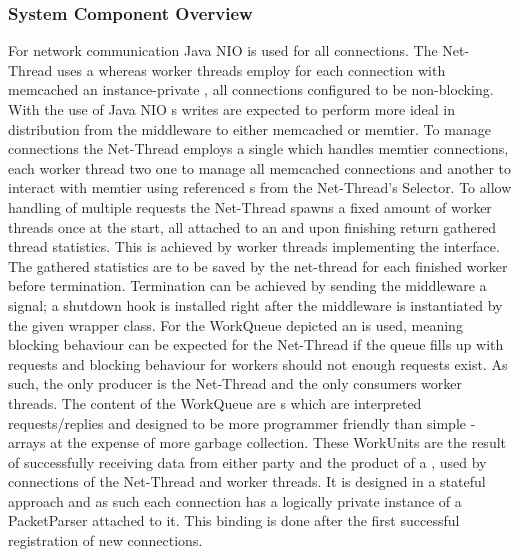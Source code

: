     \subsubsection{System Component Overview}
        For network communication Java NIO is used for all connections. The Net-Thread uses a 
        whereas worker threads employ for each connection with memcached an instance-private , all
        connections configured to be non-blocking. With the use of Java NIO s writes are expected to perform
        more ideal in distribution from the middleware to either memcached or memtier. To manage connections the
        Net-Thread employs a single  which handles memtier connections, each worker thread two\textemdash
        one to manage all memcached connections and another to interact with memtier using referenced s
        from the Net-Thread's Selector. To allow handling of multiple requests the Net-Thread spawns a fixed amount of
        worker threads once at the start, all attached to an  and upon finishing return gathered
        thread statistics. This is achieved by worker threads implementing the  interface. The gathered
        statistics are to be saved by the net-thread for each finished worker before termination. Termination can be
        achieved by sending the middleware a  signal; a shutdown hook is installed right after the
        middleware is instantiated by the given wrapper class.\newline
        For the WorkQueue depicted an  is used, meaning blocking behaviour can be expected for
        the Net-Thread if the queue fills up with requests and blocking behaviour for workers should not enough requests
        exist. As such, the only producer is the Net-Thread and the only consumers worker threads. The content of the
        WorkQueue are s which are interpreted requests/replies and designed to be more programmer friendly
        than simple -arrays at the expense of more garbage collection. These WorkUnits are the result of
        successfully receiving data from either party and the product of a , used by connections of the
        Net-Thread and worker threads. It is designed in a stateful approach and as such each connection has a logically
        private instance of a PacketParser attached to it. This binding is done after the first successful registration
        of new connections.

